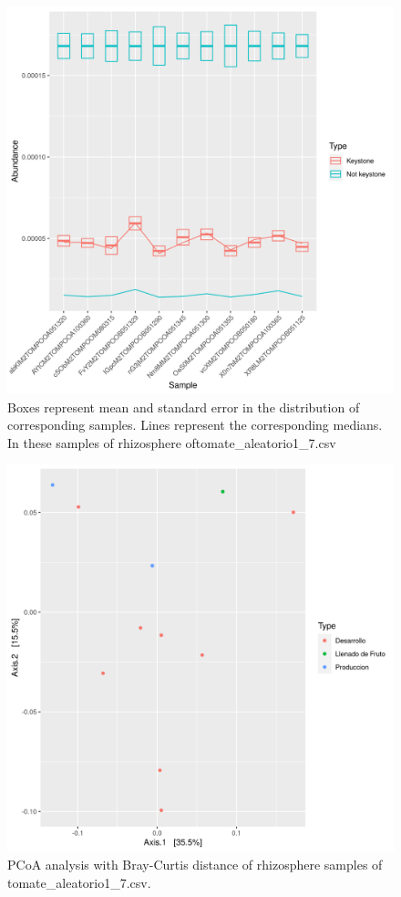 \begin{figure}
 \centering
 \includegraphics[scale = 0.75]{mean_median_key_vs_not_key_tomate_aleatorio1_7.csv.png}
\caption{Boxes represent mean and standard error in the distribution of corresponding samples. Lines represent the corresponding medians. In these samples of rhizosphere oftomate_aleatorio1_7.csv}
\label{mean_median_tomate_aleatorio1_7.csv}
\end{figure}
\begin{figure}
   \centering
   \includegraphics[scale = 0.7]{pcoa_muestras_tomate_aleatorio1_7.csv.png}
 \caption{PCoA analysis with Bray-Curtis distance of rhizosphere samples of tomate_aleatorio1_7.csv.}
 \label{fig:tomate_aleatorio1_7.csv_pcoa}
\end{figure}
